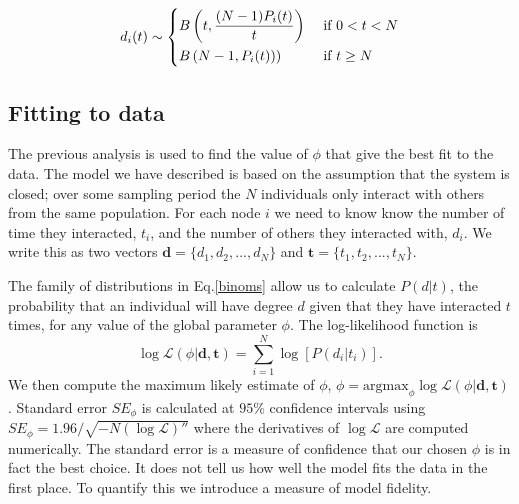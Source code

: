 \documentclass[10pt]{article}
\begin{document}
\begin{multicols}{2}
\begin{equation}
\label{binoms} 
d_{i}(t) \sim 
   \begin{dcases}
    B\left(t,\frac{(N-1)P_{i}(t)}{t}\right) & \text{ if }0<t<N\\
    B\left(N-1,P_{i}(t))\right) & \text{ if } t \geq N
  \end{dcases}
\end{equation}
\subsection{Fitting to data}
\label{fitting}
The previous analysis is used to find the value of $\phi$ that give the best fit to the data. The model we have described is based on the assumption that the system is closed; over some sampling period the $N$ individuals only interact with others from the same population. For each node $i$ we need to know know the number of time they interacted, $t_{i}$, and the number of others they interacted with, $d_{i}$. We write this as two vectors $\textbf{d}=\{d_{1},d_{2},...,d_{N}\}$ and $\textbf{t}=\{t_{1},t_{2},...,t_{N}\}$.

The family of distributions in Eq.\eqref{binoms} allow us to calculate $P(d|t)$, the probability that an individual will have degree $d$ given that they have interacted $t$ times, for any value of the global parameter $\phi$. The log-likelihood function is
\begin{equation}
\log \mathcal{L}(\phi|\textbf{d},\textbf{t})=\sum_{i=1}^{N}\log[P(d_{i}|t_{i})].
\end{equation}
We then compute the maximum likely estimate of $\phi$, $\phi=\text{argmax}_{\phi}\log \mathcal{L}(\phi|\textbf{d},\textbf{t})$. Standard error $SE_{\phi}$ is calculated at $95\%$ confidence intervals using $SE_{\phi}=1.96/\sqrt{-N(\log \mathcal{L})''}$ where the derivatives of $\log \mathcal{L}$ are computed numerically. The standard error is a measure of confidence that our chosen $\phi$ is in fact the best choice. It does not tell us how well the model fits the data in the first place. To quantify this we introduce a measure of model fidelity.


\end{multicols}
\end{document}
